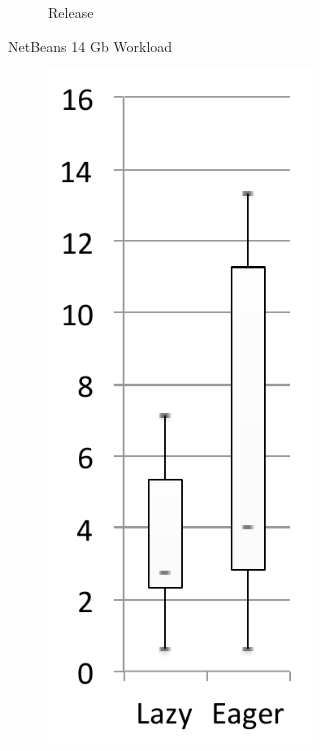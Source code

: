 \documentclass[sigplan,10pt,screen]{acmart}\settopmatter{printfolios=true,printccs=true,printacmref=true}
\begin{document}
\begin{figure}[bth]
\begin{subfigure}[b]{.48\textwidth}
\begin{subfigure}[b]{.24\textwidth}
		\caption{Release}
   	\end{subfigure}%
	\caption*{NetBeans 14 Gb Workload}
	\end{subfigure}%
	\begin{subfigure}[b]{.48\textwidth}
    	\begin{subfigure}[b]{.24\textwidth}
    		\includegraphics[width=\linewidth]{figures/wildflyLoad} 

\end{subfigure}
\end{subfigure}
\end{figure}
\end{document}
